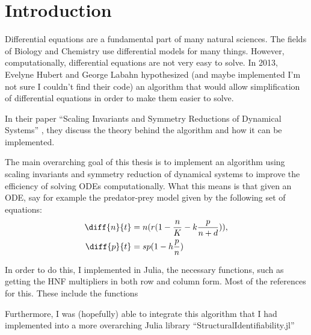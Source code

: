 \documentclass[oneside, a4paper, onecolumn, 11pt]{article}
\begin{document}
\newpage
\tableofcontents
\newpage


\section{Introduction}

Differential equations are a fundamental part of many natural sciences. The fields of Biology and Chemistry use differential models for many things. However, computationally, differential equations are not very easy to solve. In 2013, Evelyne Hubert and George Labahn hypothesized (and maybe implemented I'm not sure I couldn't find their code) an algorithm that would allow simplification of differential equations in order to make them easier to solve.

In their paper ``Scaling Invariants and Symmetry Reductions of Dynamical Systems'' \cite{Hubert2013}, they discuss the theory behind the algorithm and how it can be implemented.

The main overarching goal of this thesis is to implement an algorithm using scaling invariants and symmetry reduction of dynamical systems to improve the efficiency of solving ODEs computationally. What this means is that given an ODE, say for example the predator-prey model given by the following set of equations:
\begin{align*}
    \diff{n}{t}
     & = n (r (1 - \frac{n}{K} - k \frac{p}{n + d})), \\
    \diff{p}{t}
     & = sp (1 - h \frac{p}{n})
\end{align*}

In order to do this, I implemented in Julia, the necessary functions, such as getting the HNF multipliers in both row and column form. Most of the references for this. These include the functions \cite{Hubert2013}

Furthermore, I was (hopefully) able to integrate this algorithm that I had implemented into a more overarching Julia library ``StructuralIdentifiability.jl''


\end{document}
